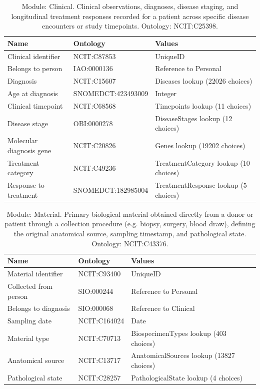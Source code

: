 \documentclass{article}
\begin{document}
\begin{table}[htb]
\begin{tabular}{lll}
Name & Ontology & Values \\
\hline
Clinical identifier & NCIT:C87853 & UniqueID \\
Belongs to person & IAO:0000136 & Reference to Personal \\
Diagnosis & NCIT:C15607 & Diseases lookup (22026 choices) \\
Age at diagnosis & SNOMEDCT:423493009 & Integer \\
Clinical timepoint & NCIT:C68568 & Timepoints lookup (11 choices) \\
Disease stage & OBI:0000278 & DiseaseStages lookup (12 choices) \\
Molecular diagnosis gene & NCIT:C20826 & Genes lookup (19202 choices) \\
Treatment category & NCIT:C49236 & TreatmentCategory lookup (10 choices) \\
Response to treatment & SNOMEDCT:182985004 & TreatmentResponse lookup (5 choices) \\
\hline
\end{tabular}
\caption[Module: Clinical]{\label{table:table6} Module: Clinical. Clinical observations, diagnoses, disease staging, and longitudinal treatment responses recorded for a patient across specific disease encounters or study timepoints. Ontology: NCIT:C25398. }
\end{table}

\begin{table}[htb]
\begin{tabular}{lll}
Name & Ontology & Values \\
\hline
Material identifier & NCIT:C93400 & UniqueID \\
Collected from person & SIO:000244 & Reference to Personal \\
Belongs to diagnosis & SIO:000068 & Reference to Clinical \\
Sampling date & NCIT:C164024 & Date \\
Material type & NCIT:C70713 & BiospecimenTypes lookup (403 choices) \\
Anatomical source & NCIT:C13717 & AnatomicalSources lookup (13827 choices) \\
Pathological state & NCIT:C28257 & PathologicalState lookup (4 choices) \\
\hline
\end{tabular}
\caption[Module: Material]{\label{table:table7} Module: Material. Primary biological material obtained directly from a donor or patient through a collection procedure (e.g. biopsy, surgery, blood draw), defining the original anatomical source, sampling timestamp, and pathological state. Ontology: NCIT:C43376. }
\end{table}
\end{document}
